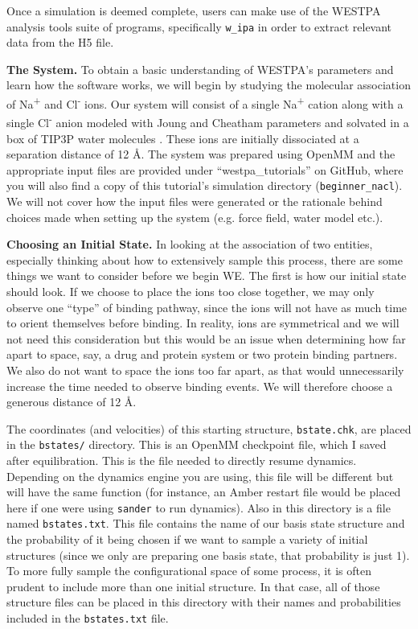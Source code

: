 \documentclass[9pt,tutorial,ASAPversion]{livecoms}
\begin{document}
Once a simulation is deemed complete, users can make use of the WESTPA analysis tools suite of programs, specifically \verb|w_ipa| in order to extract relevant data from the H5 file.

\textbf{The System.} To obtain a basic understanding of WESTPA’s parameters and learn how the software works, we will begin by studying the molecular association of Na\textsuperscript{+} and Cl\textsuperscript{-} ions. 
Our system will consist of a single Na\textsuperscript{+} cation along with a single Cl\textsuperscript{-} anion modeled with Joung and Cheatham parameters \citep{JoungCheatham2009} and solvated in a box of TIP3P water molecules \citep{tip3p}. 
These ions are initially dissociated at a separation distance of 12 \AA. 
The system was prepared using OpenMM and the appropriate input files are provided under “westpa\_tutorials” on GitHub, where you will also find a copy of this tutorial’s simulation directory (\verb|beginner_nacl|). 
We will not cover how the input files were generated or the rationale behind choices made when setting up the system (e.g. force field, water model etc.).


\textbf{Choosing an Initial State.} In looking at the association of two entities, especially thinking about how to extensively sample this process, there are some things we want to consider before we begin WE.
The first is how our initial state should look. If we choose to place the ions too close together, we may only observe one “type” of binding pathway, since the ions will not have as much time to orient themselves before binding. 
In reality, ions are symmetrical and we will not need this consideration but this would be an issue when determining how far apart to space, say, a drug and protein system or two protein binding partners. 
We also do not want to space the ions too far apart, as that would unnecessarily increase the time needed to observe binding events. 
We will therefore choose a generous distance of 12 \AA.

The coordinates (and velocities) of this starting structure, \verb|bstate.chk|, are placed in the \verb|bstates/| directory. 
This is an OpenMM checkpoint file, which I saved after equilibration.  
This is the file needed to directly resume dynamics.  
Depending on the dynamics engine you are using, this file will be different but will have the same function (for instance, an Amber restart file would be placed here if one were using \verb|sander| to run dynamics).
Also in this directory is a file named \verb|bstates.txt|. 
This file contains the name of our basis state structure and the probability of it being chosen if we want to sample a variety of initial structures (since we only are preparing one basis state, that probability is just 1). 
To more fully sample the configurational space of some process, it is often prudent to include more than one initial structure. 
In that case, all of those structure files can be placed in this directory with their names and probabilities included in the \verb|bstates.txt| file.
\end{document}
